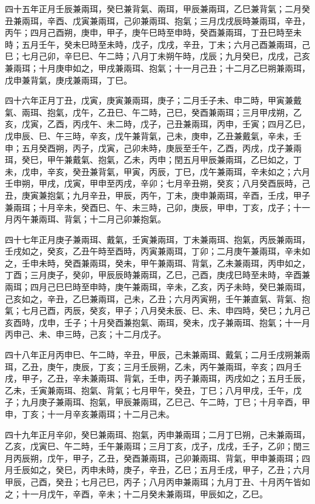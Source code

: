 \begin{pinyinscope}
四十五年正月壬辰兼兩珥，癸巳兼背氣、兩珥，甲辰兼兩珥，乙巳兼背氣；二月癸丑兼兩珥，辛酉、戊寅兼兩珥，己卯兼兩珥、抱氣；三月戊戌辰時兼兩珥，辛丑，丙午；四月己酉朔，庚申，甲子，庚午巳時至申時，癸酉兼兩珥，丁丑巳時至未時；五月壬午，癸未巳時至未時，戊子，戊戌，辛丑，丁未；六月己酉兼兩珥，己巳；七月己卯，辛巳巳、午二時；八月丁未朔午時，戊辰；九月癸巳，戊戌，己亥兼兩珥；十月庚申如之，甲戌兼兩珥、抱氣；十一月己丑；十二月乙巳朔兼兩珥，戊申兼背氣，庚戌兼兩珥，丁巳。

四十六年正月丁丑，戊寅，庚寅兼兩珥，庚子；二月壬子未、申二時，甲寅兼戴氣、兩珥、抱氣，戊午，乙丑巳、午二時，己巳，癸酉兼兩珥；三月甲戌朔，乙亥，戊寅，乙酉，丙戌午、未二時，戊子，己丑兼兩珥，丙申，壬寅；四月乙巳，戊申辰、巳、午三時，辛亥，戊午兼背氣，己未，庚申，乙丑兼戴氣，辛未，壬申；五月癸酉朔，丙子，戊寅，己卯未時，庚辰至壬午，乙酉，丙戌，戊子兼兩珥，癸巳，甲午兼戴氣、抱氣，乙未，丙申；閏五月甲辰兼兩珥，乙巳如之，丁未，戊申，辛亥，癸丑兼背氣，甲寅，丙辰，丁巳，戊午兼兩珥，辛未如之；六月壬申朔，甲戌，戊寅，甲申至丙戌，辛卯；七月辛丑朔，癸亥；八月癸酉辰時，己丑，庚寅兼抱氣；九月辛丑，甲辰，丙午，丁未，庚申兼兩珥，辛酉，壬戌，甲子兼兩珥；十月辛未，癸酉巳、午、未三時，己卯，庚辰，甲申，丁亥，戊子；十一月丙午兼兩珥、背氣；十二月己卯兼抱氣。

四十七年正月庚子兼兩珥、戴氣，壬寅兼兩珥，丁未兼兩珥、抱氣，丙辰兼兩珥，壬戌如之，癸亥，乙丑午時至酉時，丙寅兼兩珥，丁卯；二月庚午兼兩珥，辛未如之，壬申未時，癸酉兼兩珥，癸未，甲午兼兩珥、背氣，乙未兼兩珥，丙申如之，丁酉；三月庚子，癸卯，甲辰辰時兼兩珥，乙巳，己酉，庚戌巳時至未時，辛酉兼兩珥；四月己巳巳時至申時，庚午兼兩珥，辛未，乙亥，丙子未時，癸巳兼兩珥，己亥如之，辛丑，乙巳兼兩珥，己未，乙丑；六月丙寅朔，壬午兼直氣、背氣、抱氣；七月己酉，丙辰，癸亥，甲子；八月癸未辰、巳、未、申四時，癸巳；九月己亥酉時，戊申，壬子；十月癸酉兼抱氣、兩珥，癸未，戊子兼兩珥、抱氣；十一月丙申己、未、申三時，己亥；十二月戊子。

四十八年正月丙申巳、午二時，辛丑，甲辰，己未兼兩珥、戴氣；二月壬戌朔兼兩珥，乙丑，庚午，庚辰，丁亥；三月壬辰朔，乙未，丙午兼兩珥，辛亥；四月壬戌，甲子，乙丑，辛未兼兩珥、背氣，壬申，丙子兼兩珥，丙戌如之；五月壬辰，乙未，壬寅兼兩珥、抱氣、背氣；七月甲午，癸丑，丁巳；八月甲戌，壬午，戊子；九月庚子兼兩珥、抱氣，甲辰兼兩珥，乙巳己、午二時，丁巳；十月辛酉，甲申，丁亥；十一月辛亥兼兩珥；十二月己未。

四十九年正月辛卯，癸巳兼兩珥、抱氣，丙申兼兩珥；二月丁巳朔，己未兼兩珥，乙亥，戊寅巳、午二時，壬午兼兩珥；三月丁亥，戊子，戊戌，壬子，乙卯；閏三月丙辰朔，戊午，甲子，乙丑，癸酉兼兩珥，己卯兼兩珥、背氣，甲申兼兩珥；四月壬辰如之，癸巳，丙申未時，庚子，辛丑，乙巳；五月壬戌，甲子，乙丑；六月甲辰，己酉，癸丑；七月己巳，丙子；八月丙申兼兩珥；九月丁丑、十月丙午皆如之；十一月戊午，辛酉，辛未；十二月癸未兼兩珥，甲辰如之，乙巳。


\end{pinyinscope}
